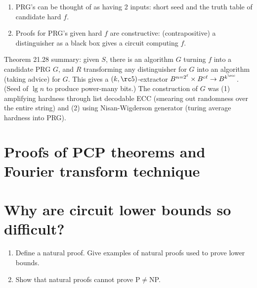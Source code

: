 \begin{enumerate}
\begin{enumerate}
\item PRG's can be thought of as having 2 inputs: short seed and the truth table of candidate hard $f$.
\item Proofs for PRG's given hard $f$ are constructive: (contrapositive) a distinguisher as a black box gives a circuit computing $f$.
\end{enumerate}
Theorem 21.28 summary: given $S$, there is an algorithm $G$ turning $f$ into a candidate PRG $G$, and $R$ transforming any distinguisher for $G$ into an algorithm (taking advice) for $G$. 
This gives a $(k,\rc5)$-extractor $B^{n=2^\ell}\times B^{c\ell}\to B^{k^{\rc c}}$. (Seed of $\lg n$ to produce power-many bits.)  The construction of $G$ was (1) amplifying hardness through list decodable ECC (smearing out randomness over the entire string) and (2) using Nisan-Wigderson generator (turing average hardness into PRG).
\end{enumerate}
\section{Proofs of PCP theorems and Fourier transform technique}
\section{Why are circuit lower bounds so difficult?}

\begin{enumerate}
\item
Define a natural proof. Give examples of natural proofs used to prove lower bounds.
\item Show that natural proofs cannot prove P$\ne$NP.
\end{enumerate}

